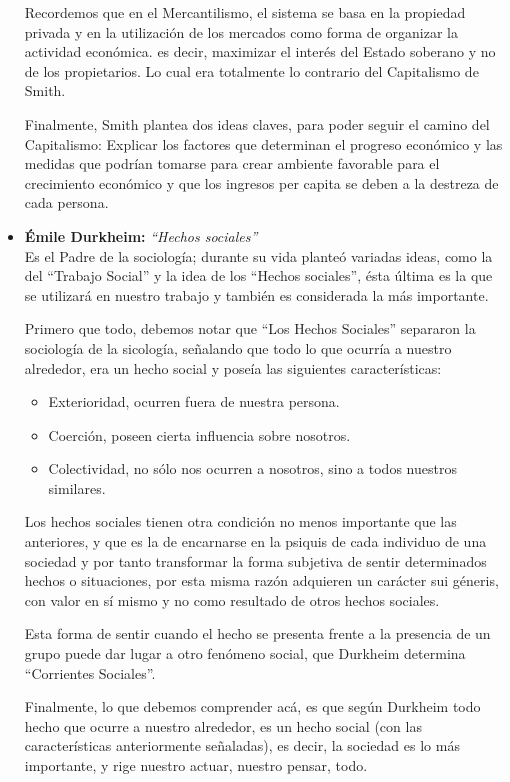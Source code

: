 \begin{itemize}
	Recordemos que en el Mercantilismo,
	el sistema se basa en la propiedad privada y
	en la utilización de los mercados como forma de organizar la actividad económica.
	es decir, maximizar el interés del Estado soberano y no de los propietarios.
	Lo cual era totalmente lo contrario del Capitalismo de Smith.
	
	Finalmente,
	Smith plantea dos ideas claves,
	para poder seguir el camino del Capitalismo:
	Explicar los factores que determinan el progreso económico y
	las medidas que podrían tomarse para crear ambiente favorable para el crecimiento económico y
	que los ingresos per capita se deben a la destreza de cada persona.
		
	\item \textbf{\'Emile Durkheim:} \emph{``Hechos sociales''}\\
	Es el Padre de la sociología;
	durante su vida planteó variadas ideas,
	como la del ``Trabajo Social'' y la idea de los ``Hechos sociales'',
	ésta última es la que se utilizará en nuestro trabajo y también
	es considerada la más importante.

	Primero que todo,
	debemos notar que  ``Los Hechos Sociales'' separaron la sociología de la sicología,
	señalando que todo lo que ocurría a nuestro alrededor,
	era un hecho social y poseía las siguientes características:
	\begin{itemize}
			\item Exterioridad, ocurren fuera de nuestra persona.
			\item Coerción, poseen cierta influencia sobre nosotros.
			\item Colectividad, no sólo nos ocurren a nosotros, sino a todos nuestros similares.
	\end{itemize}

	Los hechos sociales tienen otra condición no menos importante que las anteriores,
	y que es la de encarnarse en la psiquis de cada individuo de una sociedad
	y por tanto transformar la forma subjetiva de sentir determinados hechos o situaciones,
	por esta misma razón adquieren un carácter sui géneris,
	con valor en sí mismo y no como resultado de otros hechos sociales.
	
	Esta forma de sentir cuando el hecho se presenta frente a la presencia de un grupo puede dar
	lugar a otro fenómeno social, que Durkheim determina ``Corrientes Sociales''.

	Finalmente,
	lo que debemos comprender acá,
	es que según Durkheim
	todo hecho que ocurre a nuestro alrededor,
	es un hecho social (con las características anteriormente señaladas),
	es decir,
	la sociedad es lo más importante,
	y rige nuestro actuar, nuestro pensar, todo.
	

\end{itemize}
